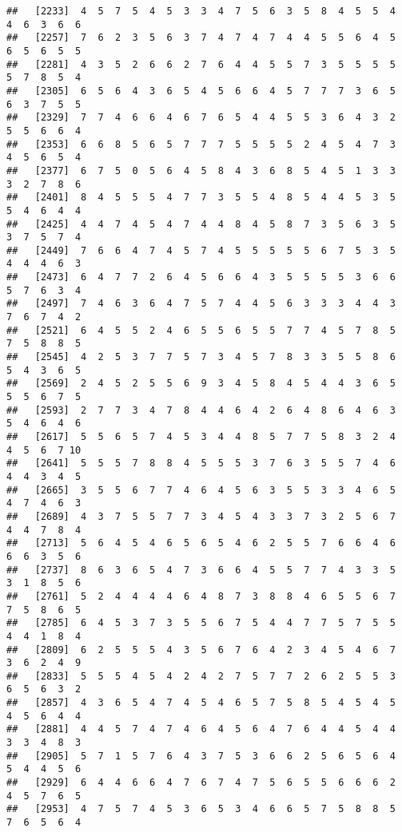\documentclass[
]{book}
\begin{document}
\begin{verbatim}
##   [2233]  4  5  7  5  4  5  3  3  4  7  5  6  3  5  8  4  5  5  4  4  6  3  6  6
##   [2257]  7  6  2  3  5  6  3  7  4  7  4  7  4  4  5  5  6  4  5  6  5  6  5  5
##   [2281]  4  3  5  2  6  6  2  7  6  4  4  5  5  7  3  5  5  5  5  5  7  8  5  4
##   [2305]  6  5  6  4  3  6  5  4  5  6  6  4  5  7  7  7  3  6  5  6  3  7  5  5
##   [2329]  7  7  4  6  6  4  6  7  6  5  4  4  5  5  3  6  4  3  2  5  5  6  6  4
##   [2353]  6  6  8  5  6  5  7  7  7  5  5  5  5  2  4  5  4  7  3  4  5  6  5  4
##   [2377]  6  7  5  0  5  6  4  5  8  4  3  6  8  5  4  5  1  3  3  3  2  7  8  6
##   [2401]  8  4  5  5  5  4  7  7  3  5  5  4  8  5  4  4  5  3  5  5  4  6  4  4
##   [2425]  4  4  7  4  5  4  7  4  4  8  4  5  8  7  3  5  6  3  5  3  7  5  7  4
##   [2449]  7  6  6  4  7  4  5  7  4  5  5  5  5  5  6  7  5  3  5  4  4  4  6  3
##   [2473]  6  4  7  7  2  6  4  5  6  6  4  3  5  5  5  5  3  6  6  5  7  6  3  4
##   [2497]  7  4  6  3  6  4  7  5  7  4  4  5  6  3  3  3  4  4  3  7  6  7  4  2
##   [2521]  6  4  5  5  2  4  6  5  5  6  5  5  7  7  4  5  7  8  5  7  5  8  8  5
##   [2545]  4  2  5  3  7  7  5  7  3  4  5  7  8  3  3  5  5  8  6  5  4  3  6  5
##   [2569]  2  4  5  2  5  5  6  9  3  4  5  8  4  5  4  4  3  6  5  5  5  6  7  5
##   [2593]  2  7  7  3  4  7  8  4  4  6  4  2  6  4  8  6  4  6  3  5  4  6  4  6
##   [2617]  5  5  6  5  7  4  5  3  4  4  8  5  7  7  5  8  3  2  4  4  5  6  7 10
##   [2641]  5  5  5  7  8  8  4  5  5  5  3  7  6  3  5  5  7  4  6  4  4  3  4  5
##   [2665]  3  5  5  6  7  7  4  6  4  5  6  3  5  5  3  3  4  6  5  4  7  4  6  3
##   [2689]  4  3  7  5  5  7  7  3  4  5  4  3  3  7  3  2  5  6  7  4  4  7  8  4
##   [2713]  5  6  4  5  4  6  5  6  5  4  6  2  5  5  7  6  6  4  6  6  6  3  5  6
##   [2737]  8  6  3  6  5  4  7  3  6  6  4  5  5  7  7  4  3  3  5  3  1  8  5  6
##   [2761]  5  2  4  4  4  4  6  4  8  7  3  8  8  4  6  5  5  6  7  7  5  8  6  5
##   [2785]  6  4  5  3  7  3  5  5  6  7  5  4  4  7  7  5  7  5  5  4  4  1  8  4
##   [2809]  6  2  5  5  5  4  3  5  6  7  6  4  2  3  4  5  4  6  7  3  6  2  4  9
##   [2833]  5  5  5  4  5  4  2  4  2  7  5  7  7  2  6  2  5  5  3  6  5  6  3  2
##   [2857]  4  3  6  5  4  7  4  5  4  6  5  7  5  8  5  4  5  4  5  4  5  6  4  4
##   [2881]  4  4  5  7  4  7  4  6  4  5  6  4  7  6  4  4  5  4  4  3  3  4  8  3
##   [2905]  5  7  1  5  7  6  4  3  7  5  3  6  6  2  5  6  5  6  4  5  4  4  5  6
##   [2929]  6  4  4  6  6  4  7  6  7  4  7  5  6  5  5  6  6  6  2  4  5  7  6  5
##   [2953]  4  7  5  7  4  5  3  6  5  3  4  6  6  5  7  5  8  8  5  7  6  5  6  4

\end{verbatim}
\end{document}
